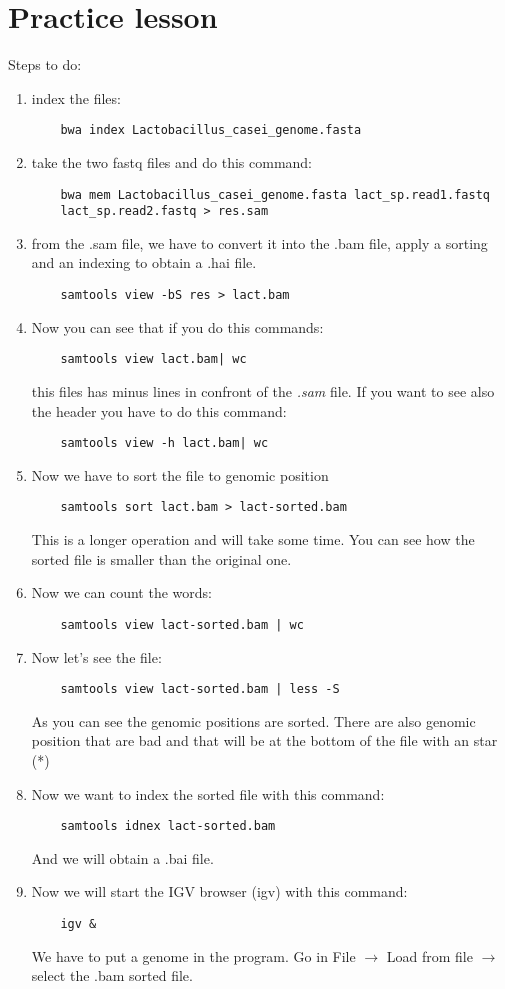 \section{Practice lesson}
Steps to do:
\begin{enumerate}
	\item index the files:
	\begin{verbatim}
	bwa index Lactobacillus_casei_genome.fasta
	\end{verbatim}
	\item take the two fastq files and do this command:
	\begin{verbatim}
	bwa mem Lactobacillus_casei_genome.fasta lact_sp.read1.fastq 
	lact_sp.read2.fastq > res.sam
	\end{verbatim}
	\item from the .sam file, we have to convert it into the .bam file, apply a 
	sorting and an indexing to obtain a .hai file.
	\begin{verbatim}
	samtools view -bS res > lact.bam
	\end{verbatim}
	\item Now you can see that if you do this commands:
	\begin{verbatim}
	samtools view lact.bam| wc
	\end{verbatim}
	this files has minus lines in confront of the \textit{.sam} file. If you want 
	to see also the header you have to do this command:
	\begin{verbatim}
	samtools view -h lact.bam| wc
	\end{verbatim}
	\item Now we have to sort the file to genomic position %
	\begin{verbatim}
	samtools sort lact.bam > lact-sorted.bam
	\end{verbatim}
	This is a longer operation and will take some time. You can see how the 
	sorted file is smaller than the original one.
	\item Now we can count the words:
	\begin{verbatim}
	samtools view lact-sorted.bam | wc
	\end{verbatim}
	\item Now let's see the file:
	\begin{verbatim}
	samtools view lact-sorted.bam | less -S
	\end{verbatim}
	As you can see the genomic positions are sorted. There are also genomic 
	position that are bad and that will be at the bottom of the file with an star 
	(*)
	\item Now we want to index the sorted file with this command:
	\begin{verbatim}
	samtools idnex lact-sorted.bam
	\end{verbatim}
	And we will obtain a .bai file.
	\item Now we will start the IGV browser (igv) with this command:
	\begin{verbatim}
	igv &
	\end{verbatim}
	We have to put a genome in the program. Go in File $\to$ Load from file $\to$ 
	select the .bam sorted file.
\end{enumerate}
